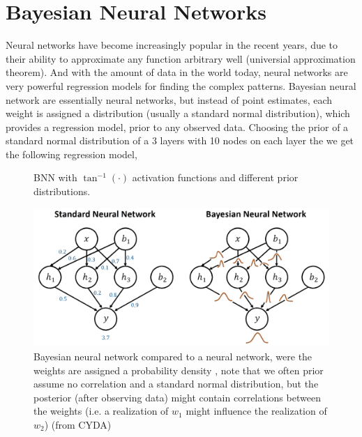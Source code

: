 \section{Bayesian Neural Networks}\label{BNN}
Neural networks have become increasingly popular in the recent years, due to their ability to
approximate any function arbitrary well (universial approximation theorem). And with the amount of
data in the world today, neural
networks are very powerful regression models for finding the complex patterns. Bayesian neural
network are essentially neural networks, but instead of point estimates, each weight is assigned a
distribution (usually a standard normal distribution), which provides a regression model, 
prior to any observed data. Choosing the prior of a standard normal distribution of a 
3 layers with 10 nodes on each layer the we get the following regression model, 
\begin{figure}
    \caption{BNN with $\tan^{-1}(\cdot)$ activation functions and different prior distributions. }%
    \label{fig:example2}%
\end{figure}

\begin{figure}
    \centering
    \includegraphics[width=\textwidth]{Pictures/BNN_illustration.pdf}
    \caption*{Bayesian neural network compared to a neural network, were the weights are assigned a
    probability density , note that we often prior assume no correlation and a standard normal
    distribution, but the posterior (after observing data) might contain correlations between the
    weights (i.e. a realization of $w_1$ might influence the realization of $w_2$) (from CYDA)}
\end{figure}


